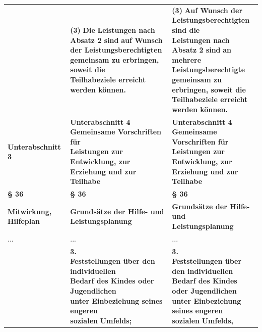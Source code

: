 \documentclass[10pt,a4paper,landscape]{article}
\begin{document}
\begin{longtable}{|L{8.2cm}|L{8.2cm}|L{8.2cm}|}
 & \textbf{(3) }\textbf{\textcolor{diffred}{Die}}\textbf{ Leistungen nach Absatz 2 sind} \newline \textbf{\textcolor{diffred}{auf Wunsch der Leistungsberechtigten}}\textbf{  \newline gemeinsam zu erbringen, soweit die  \newline Teilhabeziele erreicht werden können. } & \textbf{(3) }\textbf{\textcolor{diffgreen}{Auf Wunsch der  \newline Leistungsberechtigten sind die}}\textbf{  \newline Leistungen nach Absatz 2 sind }\textbf{\textcolor{diffgreen}{an  \newline mehrere Leistungsberechtigte}}\textbf{  \newline gemeinsam zu erbringen, soweit die  \newline Teilhabeziele erreicht werden können.  } \\
\hhline{|---|}
\textbf{Unterabschnitt }\textbf{\textcolor{diffred}{3}} & \textbf{Unterabschnitt 4   \newline Gemeinsame Vorschriften für  \newline Leistungen zur Entwicklung, zur  \newline Erziehung und zur Teilhabe } & \textbf{Unterabschnitt 4   \newline Gemeinsame Vorschriften für  \newline Leistungen zur Entwicklung, zur  \newline Erziehung und zur Teilhabe } \\
\hhline{|---|}
\textbf{\S{} 36} & \textbf{\S{} 36} & \textbf{\S{} 36} \\
\hhline{|---|}
\textbf{\textcolor{diffred}{Mitwirkung, Hilfeplan}} & \textbf{Grundsätze der Hilfe- und  \newline Leistungsplanung } & \textbf{Grundsätze der Hilfe- und  \newline Leistungsplanung } \\
\hhline{|---|}
... & ... & ... \\
\hhline{|---|}
 & \textbf{3.   \newline Feststellungen über den individuellen  \newline Bedarf des Kindes oder Jugendlichen  \newline unter Einbeziehung seines engeren  \newline sozialen }\textbf{\textcolor{diffred}{Umfelds;}} & \textbf{3.   \newline Feststellungen über den individuellen  \newline Bedarf des Kindes oder Jugendlichen  \newline unter Einbeziehung seines engeren  \newline sozialen }\textbf{\textcolor{diffgreen}{Umfelds,}} \\

\end{longtable}
\end{document}
